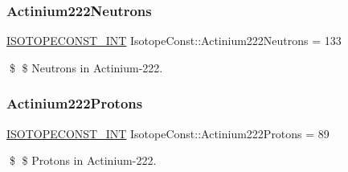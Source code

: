 \subsubsection{\texorpdfstring{Actinium222\+Neutrons}{Actinium222Neutrons}}
{\footnotesize\ttfamily \mbox{\hyperlink{group___isotope_const-_macros_ga5f18360b3e99483a35c32d789e62621c}{I\+S\+O\+T\+O\+P\+E\+C\+O\+N\+S\+T\+\_\+\+I\+NT}} Isotope\+Const\+::\+Actinium222\+Neutrons = 133}

\$ \$ Neutrons in Actinium-\/222. \mbox{\label{group___isotope_const-_actinium-_ac222_ga545790ccaa58b5b455014df2820621e5}} 
\subsubsection{\texorpdfstring{Actinium222\+Protons}{Actinium222Protons}}
{\footnotesize\ttfamily \mbox{\hyperlink{group___isotope_const-_macros_ga5f18360b3e99483a35c32d789e62621c}{I\+S\+O\+T\+O\+P\+E\+C\+O\+N\+S\+T\+\_\+\+I\+NT}} Isotope\+Const\+::\+Actinium222\+Protons = 89}

\$ \$ Protons in Actinium-\/222. 